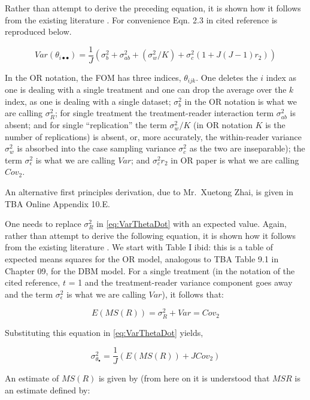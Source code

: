 \documentclass[
]{book}
\begin{document}
Rather than attempt to derive the preceding equation, it is shown how it follows from the existing literature \citep{RN1450}. For convenience Eqn. 2.3 in cited reference is reproduced below.

\begin{equation}
Var(\theta_{i \bullet \bullet}) =\frac{1}{J}(\sigma_{b}^{2}+\sigma_{ab}^{2}+(\sigma_{w}^{2}/K) + \sigma_{c}^{2}(1+J(J-1)r_2))
\label{eq:VarThetaiDotDot}
\end{equation}

In the OR notation, the FOM has three indices, \(\theta_{ijk}\). One deletes the \(i\) index as one is dealing with a single treatment and one can drop the average over the \(k\) index, as one is dealing with a single dataset; \(\sigma_{b}^{2}\) in the OR notation is what we are calling \(\sigma_{R}^{2}\); for single treatment the treatment-reader interaction term \(\sigma_{ab}^{2}\) is absent; and for single ``replication'' the term \(\sigma_{w}^{2}/K\) (in OR notation \(K\) is the number of replications) is absent, or, more accurately, the within-reader variance \(\sigma_{w}^{2}\) is absorbed into the case sampling variance \(\sigma_{c}^{2}\) as the two are inseparable); the term \(\sigma_{\epsilon}^{2}\) is what we are calling \(Var\); and \(\sigma_{c}^{2}r_2\) in OR paper is what we are calling \(Cov_2\).

An alternative first principles derivation, due to Mr.~Xuetong Zhai, is given in TBA Online Appendix 10.E.

One needs to replace \(\sigma_{R}^{2}\) in \eqref{eq:VarThetaDot} with an expected value. Again, rather than attempt to derive the following equation, it is shown how it follows from the existing literature \citep{RN2508}. We start with Table I ibid: this is a table of expected means squares for the OR model, analogous to TBA Table 9.1 in Chapter 09, for the DBM model. For a single treatment (in the notation of the cited reference, \(t\) = 1 and the treatment-reader variance component goes away and the term \(\sigma_{\epsilon}^{2}\) is what we are calling \(Var\)), it follows that:

\[E(MS(R))=\sigma_{R}^{2}+Var=Cov_2\]

Substituting this equation in \eqref{eq:VarThetaDot} yields,

\begin{equation}
\sigma_{\theta_{\bullet}}^{2}=\frac{1}{J}(E(MS(R))+JCov_2)
\label{eq:VarThetaDot}
\end{equation}

An estimate of \(MS(R)\) is given by (from here on it is understood that \(MSR\) is an estimate defined by:
\end{document}
